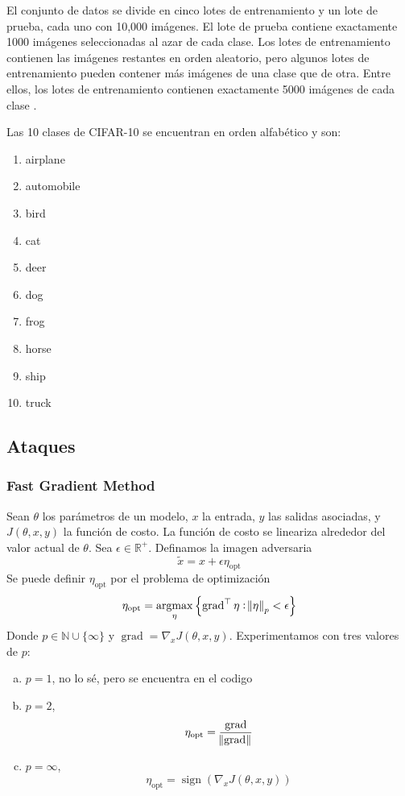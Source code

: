 El conjunto de datos se divide en cinco lotes de entrenamiento y un lote de prueba, cada uno con 10,000 imágenes. El lote de prueba contiene exactamente 1000 imágenes seleccionadas al azar de cada clase. Los lotes de entrenamiento contienen las imágenes restantes en orden aleatorio, pero algunos lotes de entrenamiento pueden contener más imágenes de una clase que de otra. Entre ellos, los lotes de entrenamiento contienen exactamente 5000 imágenes de cada clase \cite{cifarsite}. 

Las 10 clases de CIFAR-10 se encuentran en orden alfabético y son:
\begin{multicols}{5}
\begin{enumerate}
    \item airplane
    \item automobile
    \item bird
    \item cat
    \item deer
    \item dog
    \item frog
    \item horse
    \item ship
    \item truck
\end{enumerate}
\end{multicols}


\subsection{Ataques}

\subsubsection{Fast Gradient Method}
\cite{goodfellow2015explaining, maybe more}

Sean $\theta$ los parámetros de un modelo, $x$ la entrada, $y$ las salidas asociadas, y $J(\theta, x, y)$ la función de costo. La función de costo se lineariza alrededor del valor actual de $\theta$. Sea $\epsilon \in \mathbb{R}^+$. Definamos la imagen adversaria 
\[\tilde{x} = x + \epsilon \eta_{\text{opt}}\]
Se puede definir $\eta_{\text{opt}}$ por el problema de optimización
\[\eta_{\text{opt}} = \operatornamewithlimits{argmax}_{\eta}\left\{ \operatorname{grad} ^\top \eta: \norm{\eta}_p< \epsilon\right\}\]
Donde $p \in \mathbb{N} \cup \{\infty\}$ y $\operatorname{grad} = \nabla_x J(\theta, x, y)$. Experimentamos con tres valores de $p$:
\begin{enumerate}[a)]
    \item $p = 1$, no lo sé, pero se encuentra en el codigo
    \item $p = 2$,
    \[\eta_{\text{opt}} = \frac{\operatorname{grad}}{\norm{\operatorname{grad}}}\]
    \item $p = \infty$,
    \[\eta_{\text{opt}} = \operatorname{sign}(\nabla_x J(\theta, x, y))\]
\end{enumerate}

